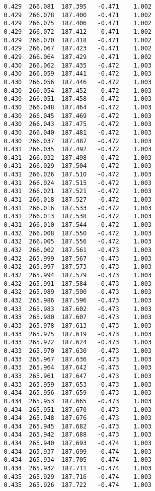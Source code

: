\begin{verbatim}
   0.429  266.081  187.395   -0.471    1.002
   0.429  266.078  187.400   -0.471    1.002
   0.429  266.075  187.406   -0.471    1.002
   0.429  266.072  187.412   -0.471    1.002
   0.429  266.070  187.418   -0.471    1.002
   0.429  266.067  187.423   -0.471    1.002
   0.429  266.064  187.429   -0.471    1.002
   0.430  266.062  187.435   -0.472    1.003
   0.430  266.059  187.441   -0.472    1.003
   0.430  266.056  187.446   -0.472    1.003
   0.430  266.054  187.452   -0.472    1.003
   0.430  266.051  187.458   -0.472    1.003
   0.430  266.048  187.464   -0.472    1.003
   0.430  266.045  187.469   -0.472    1.003
   0.430  266.043  187.475   -0.472    1.003
   0.430  266.040  187.481   -0.472    1.003
   0.430  266.037  187.487   -0.472    1.003
   0.431  266.035  187.492   -0.472    1.003
   0.431  266.032  187.498   -0.472    1.003
   0.431  266.029  187.504   -0.472    1.003
   0.431  266.026  187.510   -0.472    1.003
   0.431  266.024  187.515   -0.472    1.003
   0.431  266.021  187.521   -0.472    1.003
   0.431  266.018  187.527   -0.472    1.003
   0.431  266.016  187.533   -0.472    1.003
   0.431  266.013  187.538   -0.472    1.003
   0.431  266.010  187.544   -0.472    1.003
   0.432  266.008  187.550   -0.472    1.003
   0.432  266.005  187.556   -0.472    1.003
   0.432  266.002  187.561   -0.473    1.003
   0.432  265.999  187.567   -0.473    1.003
   0.432  265.997  187.573   -0.473    1.003
   0.432  265.994  187.579   -0.473    1.003
   0.432  265.991  187.584   -0.473    1.003
   0.432  265.989  187.590   -0.473    1.003
   0.432  265.986  187.596   -0.473    1.003
   0.433  265.983  187.602   -0.473    1.003
   0.433  265.980  187.607   -0.473    1.003
   0.433  265.978  187.613   -0.473    1.003
   0.433  265.975  187.619   -0.473    1.003
   0.433  265.972  187.624   -0.473    1.003
   0.433  265.970  187.630   -0.473    1.003
   0.433  265.967  187.636   -0.473    1.003
   0.433  265.964  187.642   -0.473    1.003
   0.433  265.961  187.647   -0.473    1.003
   0.433  265.959  187.653   -0.473    1.003
   0.434  265.956  187.659   -0.473    1.003
   0.434  265.953  187.665   -0.473    1.003
   0.434  265.951  187.670   -0.473    1.003
   0.434  265.948  187.676   -0.473    1.003
   0.434  265.945  187.682   -0.473    1.003
   0.434  265.942  187.688   -0.473    1.003
   0.434  265.940  187.693   -0.474    1.003
   0.434  265.937  187.699   -0.474    1.003
   0.434  265.934  187.705   -0.474    1.003
   0.434  265.932  187.711   -0.474    1.003
   0.435  265.929  187.716   -0.474    1.003
   0.435  265.926  187.722   -0.474    1.003

\end{verbatim}
